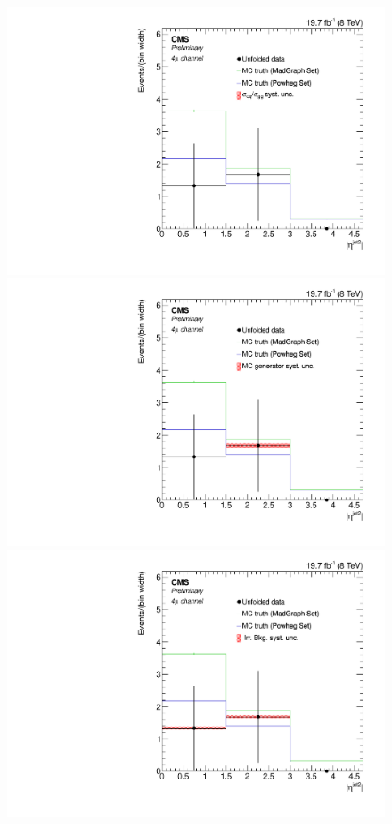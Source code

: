 \begin{figure}[hbtp]
 \begin{center}
   \includegraphics[width=0.8\cmsFigWidth]{Figures/Unfolding/Systematics/ZZTo4m_EtaJet2_qqgg_Mad_fr}     
   \includegraphics[width=0.8\cmsFigWidth]{Figures/Unfolding/Systematics/ZZTo4m_EtaJet2_MCgen_Mad_fr}     
   \includegraphics[width=0.8\cmsFigWidth]{Figures/Unfolding/Systematics/ZZTo4m_EtaJet2_IrrBkg_Mad_fr}

\end{center}
\end{figure}
